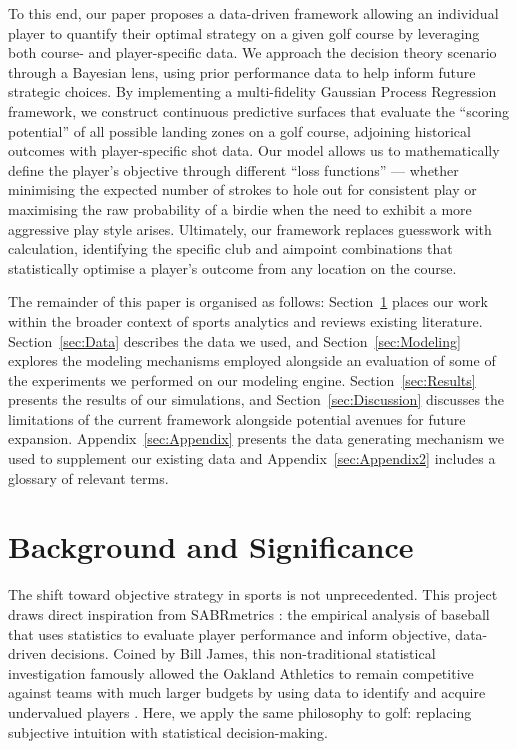 \documentclass[11pt, letterpaper]{article}
\begin{document}
To this end, our paper proposes a data-driven framework allowing an individual player to quantify their optimal strategy on a given golf course by leveraging both course- and player-specific data. We 
approach the decision theory scenario through a Bayesian lens, using prior performance data to help inform future strategic choices. By implementing a multi-fidelity Gaussian Process Regression framework, we construct continuous predictive surfaces that evaluate the ``scoring potential'' of all possible landing zones on a golf course, adjoining historical outcomes with player-specific shot data. Our model allows us to mathematically define the player's objective through different ``loss functions'' --- whether minimising the expected number of strokes to hole out for consistent play or maximising the raw probability of a birdie when the need to exhibit a more aggressive play style arises. Ultimately, our framework replaces guesswork with calculation, identifying the specific club and aimpoint combinations that statistically optimise a player's outcome from any location on the course.


The remainder of this paper is organised as follows: Section~\ref{sec:Background} places our work within the broader context of sports analytics and reviews existing literature. Section~\ref{sec:Data} describes the data we used, and Section~\ref{sec:Modeling} explores the modeling mechanisms employed alongside an evaluation of some of the experiments we performed on our modeling engine. Section~\ref{sec:Results} presents the results of our simulations, and Section~\ref{sec:Discussion} discusses the limitations of the current framework alongside potential avenues for future expansion.  Appendix~\ref{sec:Appendix} presents the data generating mechanism we used to supplement our existing data and Appendix~\ref{sec:Appendix2} includes a glossary of relevant terms.

\section{Background and Significance}
\label{sec:Background}

The shift toward objective strategy in sports is not unprecedented. This project draws direct inspiration from SABRmetrics \parencite{albert2010sabermetrics}: the empirical analysis of baseball that uses statistics to evaluate player performance and inform objective, data-driven decisions. Coined by Bill James, this non-traditional statistical investigation famously allowed the Oakland Athletics to remain competitive against teams with much larger budgets by using data to identify and acquire undervalued players \parencite{moneyball_lewis}. Here, we apply the same philosophy to golf: replacing subjective intuition with statistical decision-making.
\end{document}
